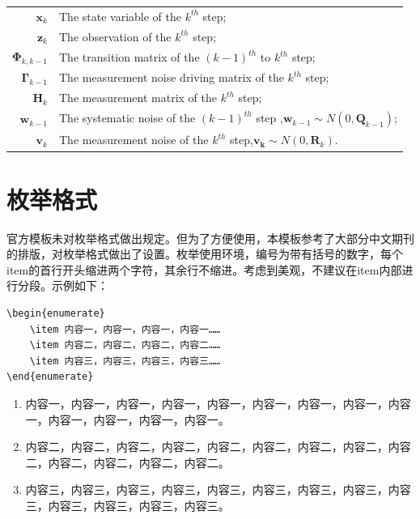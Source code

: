{\begin{spacing}{1.5}
\begin{tabular}{r@{---}l}
  $\bm{x}_k$  & The state variable of the $k^{th}$ step;\\
  $\bm{z}_k$  & The observation of the $k^{th}$ step; \\
  $\bm{\Phi}_{k,k-1}$ & The transition matrix of the $(k-1)^{th}$ to $k^{th}$ step; \\
  $\bm{\Gamma}_{k-1}$  & The measurement noise driving matrix of the $k^{th}$ step; \\
  $\bm{H}_k$  & The measurement matrix of the $k^{th}$ step;\\
  $\bm{w}_{k-1}$ & The systematic noise of the $(k-1)^{th}$ step ,$\bm{w}_{k-1}\sim N(0,\bm{Q}_{k-1})$;\\
  $\bm{v}_k$ & The measurement noise of the $k^{th}$ step,$\bm{v_k}\sim N(0,\bm{R}_k)$.
\end{tabular}

\section{枚举格式}
官方模板未对枚举格式做出规定。但为了方便使用，本模板参考了大部分中文期刊的排版，对枚举格式做出了设置。枚举使用环境，编号为带有括号的数字，每个item的首行开头缩进两个字符，其余行不缩进。考虑到美观，不建议在item内部进行分段。示例如下：

\vspace{-4ex}
\begin{lstlisting}
\begin{enumerate}
	\item 内容一，内容一，内容一，内容一……
	\item 内容二，内容二，内容二，内容二……
	\item 内容三，内容三，内容三，内容三……
\end{enumerate}
\end{lstlisting}
\vspace{-1ex}

\begin{enumerate}
	\item 内容一，内容一，内容一，内容一，内容一，内容一，内容一，内容一，内容一，内容一，内容一，内容一，内容一。
	\item 内容二，内容二，内容二，内容二，内容二，内容二，内容二，内容二，内容二，内容二，内容二，内容二，内容二。
	\item 内容三，内容三，内容三，内容三，内容三，内容三，内容三，内容三，内容三，内容三，内容三，内容三，内容三。
\end{enumerate}


\end{spacing}}
